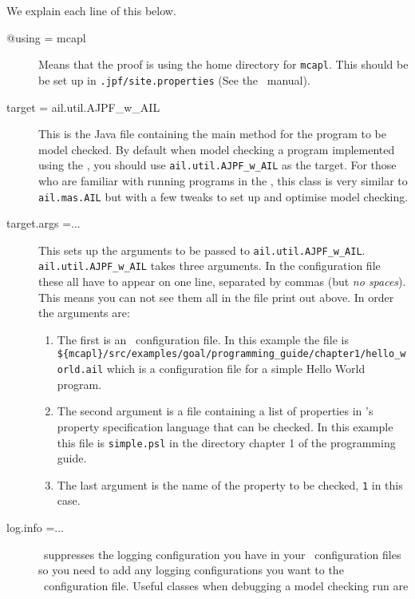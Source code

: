 \documentclass[a4]{article}
\begin{document}
We explain each line of this below.

\begin{sloppypar}
\begin{description}
\item[@using = mcapl] Means that the proof is using the home directory for \texttt{mcapl}.  This should be be set up in \texttt{.jpf/site.properties} (See the \mcapl\ manual).
\item[target = ail.util.AJPF\_w\_AIL] This is the Java file containing the main method for the program to be model checked.  By default when model checking a program implemented using the \ail, you should use \texttt{ail.util.AJPF\_w\_AIL} as the target.  For those who are familiar with running programs in the \ail, this class is very similar to \texttt{ail.mas.AIL} but with a few tweaks to set up and optimise model checking.
\item[target.args =...] This sets up the arguments to be passed to \texttt{ail.util.AJPF\_w\_AIL}.  \texttt{ail.util.AJPF\_w\_AIL} takes three arguments.  In the configuration file these all have to appear on one line, separated by commas (but \emph{no spaces}).  This means you can not see them all in the file print out above.  In order the arguments are:
\begin{enumerate}
\item The first is an \ail\ configuration file.  In this example the file is \texttt{\$\{mcapl\}/src/examples/goal/programming\_guide/chapter1/hello\_world.ail} which is a configuration file for a simple Hello World program.
\item The second argument is a file containing a list of properties in \ajpf's property specification language that can be checked.  In this example this file is \texttt{simple.psl} in the directory chapter 1 of the programming guide.
\item The last argument is the name of the property to be checked, \texttt{1} in this case.
\end{enumerate}
\item[log.info =... ] \jpf\ suppresses the logging configuration you have in your \ail\ configuration files so you need to add any logging configurations you want to the \jpf\ configuration file.  Useful classes when debugging a model checking run are


\end{description}
\end{sloppypar}
\end{document}
